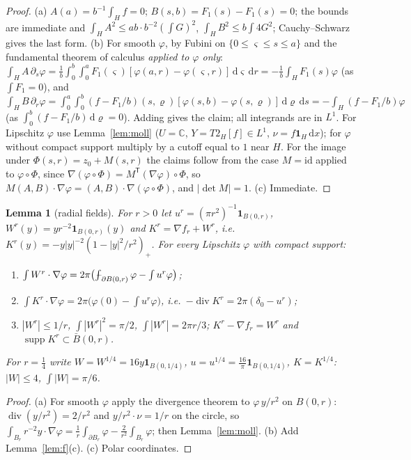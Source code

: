 \documentclass[11pt]{article}
\newtheorem{lemma}[theorem]{Lemma}
\theoremstyle{definition}
\theoremstyle{remark}
\newcommand{\C}{\mathbb C}
\newcommand{\dd}{\,\mathrm d}
\newcommand{\avg}{\fint}
\DeclareMathOperator{\supp}{supp}
\DeclareMathOperator{\Div}{div}
\def\fint{\mathop{\,\rlap{--}\!\!\int}\nolimits}
\begin{document}
\begin{proof}
(a) $A(a)=b^{-1}\int_Hf=0$; $B(s,b)=F_1(s)-F_1(s)=0$; the bounds are immediate and
$\int_HA^2\le ab\cdot b^{-2}(\int G)^2$, $\int_HB^2\le b\int4G^2$; Cauchy--Schwarz gives the last form.
(b) For smooth $\varphi$, by Fubini on $\{0\le\varsigma\le s\le a\}$ and the fundamental theorem of calculus \emph{applied to $\varphi$ only}:
$\int_HA\,\partial_s\varphi=\frac1b\int_0^b\int_0^aF_1(\varsigma)[\varphi(a,r)-\varphi(\varsigma,r)]\dd\varsigma\dd r=-\frac1b\int_HF_1(s)\varphi$ (as $\int F_1=0$), and
$\int_HB\,\partial_r\varphi=\int_0^a\int_0^b(f-F_1/b)(s,\varrho)[\varphi(s,b)-\varphi(s,\varrho)]\dd\varrho\dd s=-\int_H(f-F_1/b)\varphi$ (as $\int_0^b(f-F_1/b)\dd\varrho=0$).
Adding gives the claim; all integrands are in $L^1$. For Lipschitz $\varphi$ use Lemma~\ref{lem:moll} ($U=\C$, $Y=T2_H[f]\in L^1$, $\nu=f\mathbf 1_H\dd x$); for
$\varphi$ without compact support multiply by a cutoff equal to $1$ near $H$. For the image under $\Phi(s,r)=z_0+M(s,r)$ the claims follow from the case $M=\mathrm{id}$
applied to $\varphi\circ\Phi$, since $\nabla(\varphi\circ\Phi)=M^{\mathsf T}(\nabla\varphi)\circ\Phi$, so $M(A,B)\cdot\nabla\varphi=(A,B)\cdot\nabla(\varphi\circ\Phi)$, and $|\det M|=1$.
(c) Immediate.
\end{proof}

\begin{lemma}[radial fields]\label{lem:radial}
For $r>0$ let $u^r=(\pi r^2)^{-1}\mathbf 1_{B(0,r)}$, $W^r(y)=yr^{-2}\mathbf 1_{B(0,r)}(y)$ and $K^r=\nabla f_r+W^r$, i.e.\ $K^r(y)=-y|y|^{-2}(1-|y|^2/r^2)_+$.
For every Lipschitz $\varphi$ with compact support:
\begin{enumerate}[label=(\alph*)]
\item $\int W^r\cdot\nabla\varphi=2\pi\bigl(\avg_{\partial B(0,r)}\varphi-\int u^r\varphi\bigr)$;
\item $\int K^r\cdot\nabla\varphi=2\pi\bigl(\varphi(0)-\int u^r\varphi\bigr)$, i.e.\ $-\Div K^r=2\pi(\delta_0-u^r)$;
\item $|W^r|\le1/r$, $\int|W^r|^2=\pi/2$, $\int|W^r|=2\pi r/3$; $K^r-\nabla f_r=W^r$ and $\supp K^r\subset\bar B(0,r)$.
\end{enumerate}
For $r=\frac14$ write $W=W^{1/4}=16y\mathbf 1_{B(0,1/4)}$, $u=u^{1/4}=\frac{16}\pi\mathbf 1_{B(0,1/4)}$, $K=K^{1/4}$: $|W|\le4$, $\int|W|=\pi/6$.
\end{lemma}
\begin{proof}
(a) For smooth $\varphi$ apply the divergence theorem to $\varphi\,y/r^2$ on $B(0,r)$: $\Div(y/r^2)=2/r^2$ and $y/r^2\cdot\nu=1/r$ on the circle, so
$\int_{B_r}r^{-2}y\cdot\nabla\varphi=\frac1r\int_{\partial B_r}\varphi-\frac2{r^2}\int_{B_r}\varphi$; then Lemma~\ref{lem:moll}. (b) Add Lemma~\ref{lem:f}(c).
(c) Polar coordinates.
\end{proof}
\end{document}
